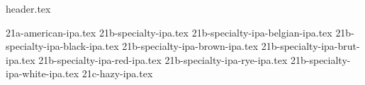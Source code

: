 \clearpage
{}
\divisorLine
{header.tex}
\begin{multicols}{2}
{21a-american-ipa.tex}
{21b-specialty-ipa.tex}
{21b-specialty-ipa-belgian-ipa.tex}
{21b-specialty-ipa-black-ipa.tex}
{21b-specialty-ipa-brown-ipa.tex}
{21b-specialty-ipa-brut-ipa.tex}
{21b-specialty-ipa-red-ipa.tex}
{21b-specialty-ipa-rye-ipa.tex}
{21b-specialty-ipa-white-ipa.tex}
{21c-hazy-ipa.tex}
\end{multicols}